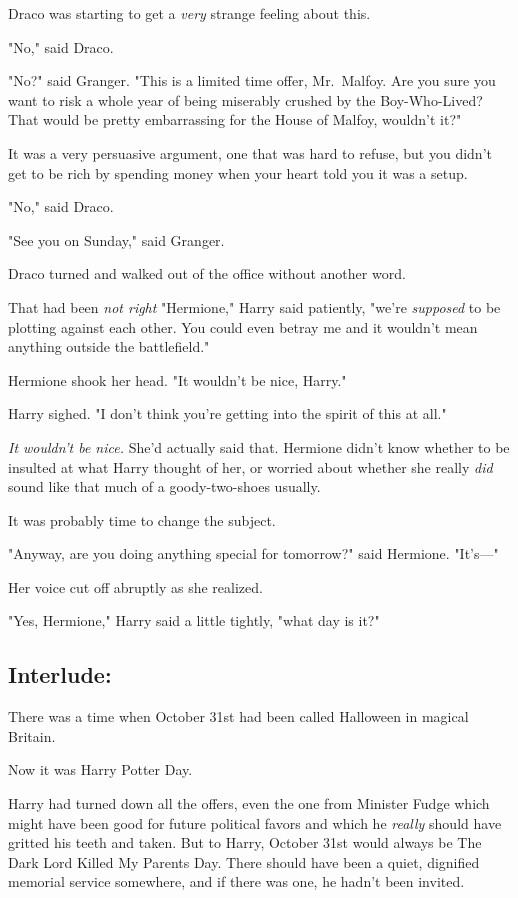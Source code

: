 Draco was starting to get a \emph{very} strange feeling about this.

"No," said Draco.

"No?" said Granger. "This is a limited time offer, Mr.~Malfoy. Are you sure you
want to risk a whole year of being miserably crushed by the Boy-Who-Lived? That
would be pretty embarrassing for the House of Malfoy, wouldn't it?"

It was a very persuasive argument, one that was hard to refuse, but you didn't
get to be rich by spending money when your heart told you it was a setup.

"No," said Draco.

"See you on Sunday," said Granger.

Draco turned and walked out of the office without another word.

That had been \emph{not right{\el}}
\sbreak
"Hermione," Harry said patiently, "we're \emph{supposed} to be plotting against
each other. You could even betray me and it wouldn't mean anything outside the
battlefield."

Hermione shook her head. "It wouldn't be nice, Harry."

Harry sighed. "I don't think you're getting into the spirit of this at all."

\emph{It wouldn't be nice.} She'd actually said that. Hermione didn't know
whether to be insulted at what Harry thought of her, or worried about whether
she really \emph{did} sound like that much of a goody-two-shoes usually.

It was probably time to change the subject.

"Anyway, are you doing anything special for tomorrow?" said Hermione. "It's---"

Her voice cut off abruptly as she realized.

"Yes, Hermione," Harry said a little tightly, "what day is it?"
\sbreak
\vspace{-2\baselineskip}
\subsection{Interlude:}

There was a time when October 31st had been called Halloween in magical Britain.

Now it was Harry Potter Day.

Harry had turned down all the offers, even the one from Minister Fudge which
might have been good for future political favors and which he \emph{really}
should have gritted his teeth and taken. But to Harry, October 31st would
always be The Dark Lord Killed My Parents Day. There should have been a quiet,
dignified memorial service somewhere, and if there was one, he hadn't been
invited.

